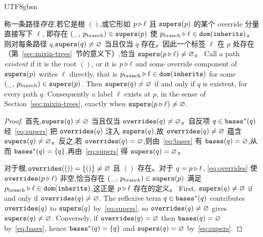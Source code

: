 \begin{CJK*}{UTF8}{gbsn}
\begin{lemma}\label{lem:path-existence}
  \ifPaperChinese
  称一条路径\emph{存在},若它是根 $()$,或它形如 $p \mathbin{\triangleright} \ell$ 且 $\mathtt{supers}(p)$ 的某个 override 分量直接写下 $\ell$,
  即存在 $(\_,\, p_{\mathrm{branch}}) \in \mathtt{supers}(p)$ 使 $p_{\mathrm{branch}} \mathbin{\triangleright} \ell \in \mathtt{dom}(\mathtt{inherits})$。
  则对每条路径 $q$,$\mathtt{supers}(q) \neq \varnothing$ 当且仅当 $q$ 存在。因此一个标签 $\ell$ 在 $p$ 处存在
  （第~\ref{sec:mixin-trees}~节的意义下）,恰当 $\mathtt{supers}(p \mathbin{\triangleright} \ell) \neq \varnothing$。
  \else
  Call a path \emph{existent} if it is the root $()$, or it is $p \mathbin{\triangleright} \ell$ and some override
  component of $\mathtt{supers}(p)$ writes $\ell$ directly, that is
  $p_{\mathrm{branch}} \mathbin{\triangleright} \ell \in \mathtt{dom}(\mathtt{inherits})$ for some
  $(\_,\, p_{\mathrm{branch}}) \in \mathtt{supers}(p)$. Then $\mathtt{supers}(q) \neq \varnothing$ if and only if
  $q$ is existent, for every path $q$. Consequently a label $\ell$ exists at $p$, in the sense of
  Section~\ref{sec:mixin-trees}, exactly when $\mathtt{supers}(p \mathbin{\triangleright} \ell) \neq \varnothing$.
  \fi
\end{lemma}
\begin{proof}
  \ifPaperChinese
  首先,$\mathtt{supers}(q) \neq \varnothing$ 当且仅当 $\mathtt{overrides}(q) \neq \varnothing$。自反项 $q \in \mathtt{bases}^*(q)$
  经~\eqref{eq:supers} 把 $\mathtt{overrides}(q)$ 注入 $\mathtt{supers}(q)$,故 $\mathtt{overrides}(q) \neq \varnothing$ 蕴含
  $\mathtt{supers}(q) \neq \varnothing$。反之,若 $\mathtt{overrides}(q) = \varnothing$,则由~\eqref{eq:bases} 有
  $\mathtt{bases}(q) = \varnothing$,从而 $\mathtt{bases}^*(q) = \{q\}$,再由~\eqref{eq:supers} 得 $\mathtt{supers}(q) = \varnothing$。

  对于根,$\mathtt{overrides}(()) = \{()\} \neq \varnothing$ 且 $()$ 存在。对于 $q = p \mathbin{\triangleright} \ell$,
  \eqref{eq:overrides} 使 $\mathtt{overrides}(p \mathbin{\triangleright} \ell)$ 非空,恰当存在 $(\_,\, p_{\mathrm{branch}}) \in \mathtt{supers}(p)$
  满足 $p_{\mathrm{branch}} \mathbin{\triangleright} \ell \in \mathtt{dom}(\mathtt{inherits})$,这正是 $p \mathbin{\triangleright} \ell$ 存在的定义。
  \else
  First, $\mathtt{supers}(q) \neq \varnothing$ if and only if $\mathtt{overrides}(q) \neq \varnothing$. The reflexive
  term $q \in \mathtt{bases}^*(q)$ contributes $\mathtt{overrides}(q)$ to $\mathtt{supers}(q)$ by~\eqref{eq:supers}, so
  $\mathtt{overrides}(q) \neq \varnothing$ gives $\mathtt{supers}(q) \neq \varnothing$. Conversely, if
  $\mathtt{overrides}(q) = \varnothing$ then $\mathtt{bases}(q) = \varnothing$ by~\eqref{eq:bases}, hence
  $\mathtt{bases}^*(q) = \{q\}$ and $\mathtt{supers}(q) = \varnothing$ by~\eqref{eq:supers}.


\end{proof}
\end{CJK*}
